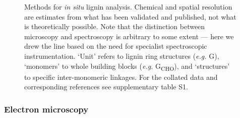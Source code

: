 \documentclass[journal=,manuscript=]{achemso}
\begin{document}
\label{cell-fig-methods}
\begin{figure}[H]


\caption{\label{fig-methods}Methods for \emph{in situ} lignin analysis.
Chemical and spatial resolution are estimates from what has been
validated and published, not what is theoretically possible. Note that
the distinction between microscopy and spectroscopy is arbitrary to some
extent --- here we drew the line based on the need for specialist
spectroscopic instrumentation. `Unit' refers to lignin ring structures
(\emph{e.g.} G), `monomers' to whole building blocks (\emph{e.g.}
G\textsubscript{CHO}), and `structures' to specific inter-monomeric
linkages. For the collated data and corresponding references see
supplementary table S1.}

\end{figure}%

\subsubsection{Electron microscopy}\label{electron-microscopy}
\end{document}
